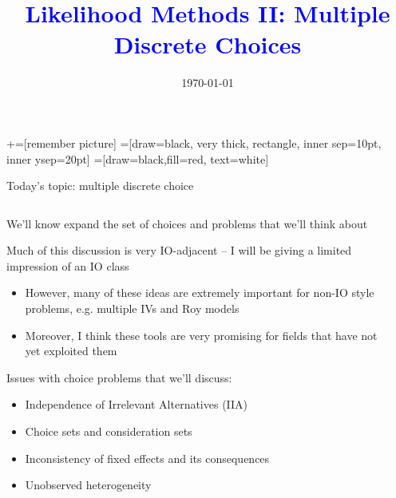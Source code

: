 \documentclass[notes,11pt, aspectratio=169]{beamer}
\title[]{\textcolor{blue}{Likelihood Methods II: Multiple Discrete Choices}}
\author[PGP]{}
\institute[FRBNY]{\small{Paul Goldsmith-Pinkham}}
\date{\today}
\newenvironment{wideitemize}{\itemize\addtolength{\itemsep}{10pt}}{\enditemize}
\begin{document}
\newcommand\marktopleft[1]{%
    \tikz[overlay,remember picture] 
        \node (marker-#1-a) at (-.3em,.3em) {};%
}
\newcommand\markbottomright[2]{%
    \tikz[overlay,remember picture] 
        \node (marker-#1-b) at (0em,0em) {};%
}
+=[remember picture] 
 =[draw=black, very thick, rectangle, inner sep=10pt, inner ysep=20pt]
 =[draw=black,fill=red, text=white]

\begin{frame}
\maketitle

\end{frame}


\begin{frame}{Today's topic: multiple discrete choice}
  \begin{columns}[T] %
    \begin{column}{.6\textwidth}
      \begin{wideitemize}
      \item We'll know expand the set of choices and problems that we'll think about
      \item Much of this discussion is very IO-adjacent -- I will be
        giving a limited impression of an IO class
        \begin{itemize}
        \item However, many of these ideas are extremely important for
          non-IO style problems, e.g. multiple IVs and Roy models
        \item Moreover, I think these tools are very promising for fields that have not yet exploited them
        \end{itemize}
      \item Issues with choice problems that we'll discuss:
        \begin{itemize}
        \item Independence of Irrelevant Alternatives (IIA)
        \item Choice sets and consideration sets
        \item Inconsistency of fixed effects and its consequences
        \item Unobserved heterogeneity
        \end{itemize}
      \end{wideitemize}
    \end{column}%
  \hfill%
  \begin{column}{.4\textwidth}
  \end{column}
\end{columns}
\end{frame}
\end{document}
